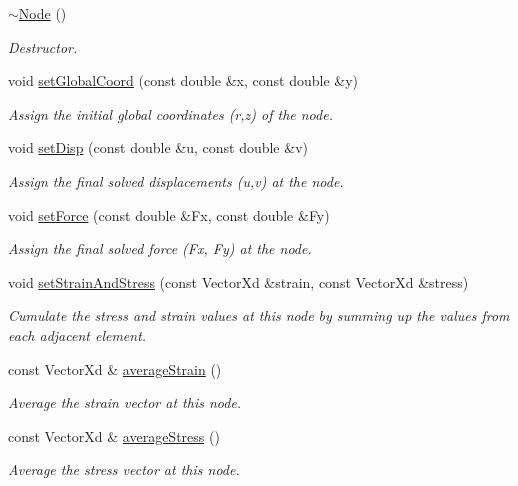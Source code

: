 \begin{DoxyCompactItemize}
\mbox{\hyperlink{class_node_aa0840c3cb5c7159be6d992adecd2097c}{$\sim$\+Node}} ()
\begin{DoxyCompactList}\small\item\em Destructor. \end{DoxyCompactList}\item 
void \mbox{\hyperlink{class_node_acea5ca0209b0c5cffa48d564320e4d56}{set\+Global\+Coord}} (const double \&x, const double \&y)
\begin{DoxyCompactList}\small\item\em Assign the initial global coordinates (r,z) of the node. \end{DoxyCompactList}\item 
void \mbox{\hyperlink{class_node_a9703bb2540dbc410edd3a168a6c51cd6}{set\+Disp}} (const double \&u, const double \&v)
\begin{DoxyCompactList}\small\item\em Assign the final solved displacements (u,v) at the node. \end{DoxyCompactList}\item 
void \mbox{\hyperlink{class_node_a261921c1143a8dfb7f7f7f454ce827e3}{set\+Force}} (const double \&Fx, const double \&Fy)
\begin{DoxyCompactList}\small\item\em Assign the final solved force (Fx, Fy) at the node. \end{DoxyCompactList}\item 
void \mbox{\hyperlink{class_node_a31e8635344b96ab5df9e6df5e5466533}{set\+Strain\+And\+Stress}} (const Vector\+Xd \&strain, const Vector\+Xd \&stress)
\begin{DoxyCompactList}\small\item\em Cumulate the stress and strain values at this node by summing up the values from each adjacent element. \end{DoxyCompactList}\item 
const Vector\+Xd \& \mbox{\hyperlink{class_node_a8a8d206f3e35f105b9a5e45d83e32126}{average\+Strain}} ()
\begin{DoxyCompactList}\small\item\em Average the strain vector at this node. \end{DoxyCompactList}\item 
const Vector\+Xd \& \mbox{\hyperlink{class_node_afe17aee2d10e0a65e48ad892a160f287}{average\+Stress}} ()
\begin{DoxyCompactList}\small\item\em Average the stress vector at this node. \end{DoxyCompactList}\item 

\end{DoxyCompactItemize}
